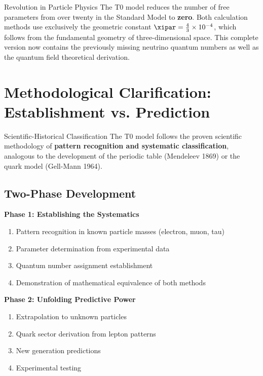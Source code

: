 	\begin{important}{Revolution in Particle Physics}{}
		The T0 model reduces the number of free parameters from over twenty in the Standard Model to \textbf{zero}. Both calculation methods use exclusively the geometric constant $\xipar = \frac{4}{3} \times 10^{-4}$, which follows from the fundamental geometry of three-dimensional space. This complete version now contains the previously missing neutrino quantum numbers as well as the quantum field theoretical derivation.
	\end{important}
	
	\section{Methodological Clarification: Establishment vs. Prediction}
	\label{sec:methodological_clarification}
	
	\begin{important}{Scientific-Historical Classification}{}
		The T0 model follows the proven scientific methodology of \textbf{pattern recognition and systematic classification}, analogous to the development of the periodic table (Mendeleev 1869) or the quark model (Gell-Mann 1964).
	\end{important}
	
	\subsection{Two-Phase Development}
	\label{subsec:two_phases}
	
	\textbf{Phase 1: Establishing the Systematics}
	\begin{enumerate}
		\item Pattern recognition in known particle masses (electron, muon, tau)
		\item Parameter determination from experimental data
		\item Quantum number assignment establishment
		\item Demonstration of mathematical equivalence of both methods
	\end{enumerate}
	
	\textbf{Phase 2: Unfolding Predictive Power}
	\begin{enumerate}
		\item Extrapolation to unknown particles
		\item Quark sector derivation from lepton patterns
		\item New generation predictions
		\item Experimental testing
	\end{enumerate}
	
